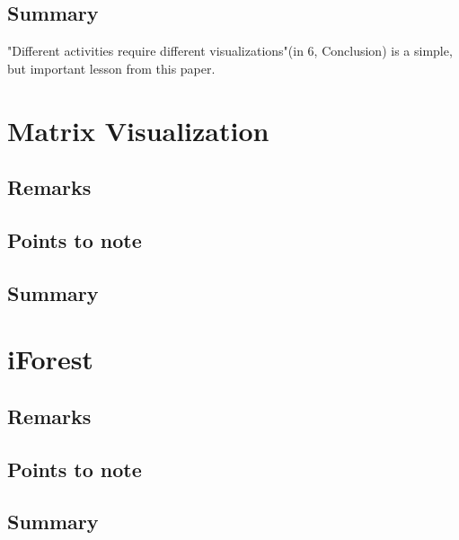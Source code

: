 \documentclass[a4paper, 12pt]{article}
\begin{document}
\subsection{Summary}
"Different activities require different visualizations"(in 6, Conclusion) is a simple, but important lesson from
this paper.

\section{Matrix Visualization}
\cite{ming2018rulematrix}

\subsection{Remarks}
\subsection{Points to note}
\subsection{Summary}

\section{iForest}
\cite{zhao2018iforest}

\subsection{Remarks}
\subsection{Points to note}
\subsection{Summary}

\clearpage


\end{document}
